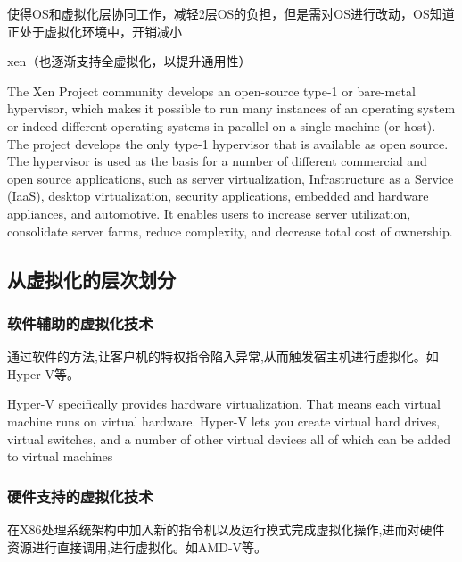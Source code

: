 使得OS和虚拟化层协同工作，减轻2层OS的负担，但是需对OS进行改动，OS知道正处于虚拟化环境中，开销减小

xen（也逐渐支持全虚拟化，以提升通用性）

\begin{definition}[Xen]
    The Xen Project community develops an open-source type-1 or bare-metal hypervisor, which makes it possible to run many instances of an operating system or indeed different operating systems in parallel on a single machine (or host). The project develops the only type-1 hypervisor that is available as open source. The hypervisor is used as the basis for a number of different commercial and open source applications, such as server virtualization, Infrastructure as a Service (IaaS), desktop virtualization, security applications, embedded and hardware appliances, and automotive. It enables users to increase server utilization, consolidate server farms, reduce complexity, and decrease total cost of ownership.
\end{definition}

\subsection{从虚拟化的层次划分}

\subsubsection{软件辅助的虚拟化技术}

\begin{definition}[软件辅助的虚拟化技术]
    通过软件的方法,让客户机的特权指令陷入异常,从而触发宿主机进行虚拟化。如Hyper-V等。
\end{definition}

\begin{definition}[Hyper-V]
    Hyper-V specifically provides hardware virtualization. That means each virtual machine runs on virtual hardware. Hyper-V lets you create virtual hard drives, virtual switches, and a number of other virtual devices all of which can be added to virtual machines
\end{definition}

\subsubsection{硬件支持的虚拟化技术}

\begin{definition}[硬件支持的虚拟化技术]
    在X86处理系统架构中加入新的指令机以及运行模式完成虚拟化操作,进而对硬件资源进行直接调用,进行虚拟化。如AMD-V等。
\end{definition}

